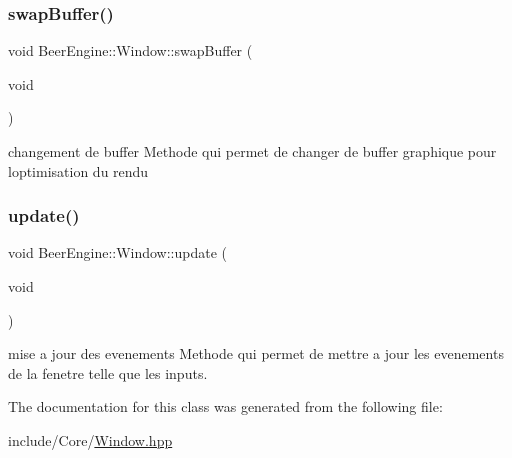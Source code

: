\subsubsection{\texorpdfstring{swap\+Buffer()}{swapBuffer()}}
{\footnotesize\ttfamily void Beer\+Engine\+::\+Window\+::swap\+Buffer (\begin{DoxyParamCaption}\item[{void}]{ }\end{DoxyParamCaption})}



changement de buffer Methode qui permet de changer de buffer graphique pour l\textquotesingle{}optimisation du rendu 

\mbox{\label{class_beer_engine_1_1_window_abc6524b9b96a88e3427dce738bfe9d4a}} 
\subsubsection{\texorpdfstring{update()}{update()}}
{\footnotesize\ttfamily void Beer\+Engine\+::\+Window\+::update (\begin{DoxyParamCaption}\item[{void}]{ }\end{DoxyParamCaption})}



mise a jour des evenements Methode qui permet de mettre a jour les evenements de la fenetre telle que les inputs. 



The documentation for this class was generated from the following file\+:\begin{DoxyCompactItemize}
\item 
include/\+Core/\mbox{\hyperlink{_window_8hpp}{Window.\+hpp}}\end{DoxyCompactItemize}
